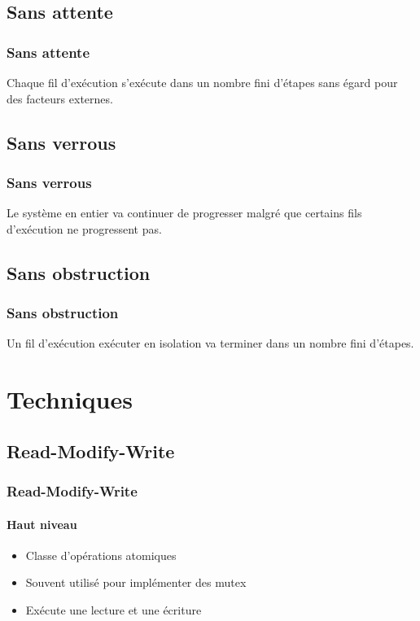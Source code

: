 \documentclass{beamer}
\begin{document}

\subsection{Sans attente}
\begin{frame}[fragile]
\frametitle{Sans attente}
Chaque fil d'exécution s'exécute dans un nombre fini d'étapes sans égard pour des facteurs externes.

\end{frame}


\subsection{Sans verrous}
\begin{frame}[fragile]
\frametitle{Sans verrous}
Le système en entier va continuer de progresser malgré que certains fils d'exécution ne progressent pas.

\end{frame}


\subsection{Sans obstruction}
\begin{frame}[fragile]
\frametitle{Sans obstruction}
Un fil d'exécution exécuter en isolation va terminer dans un nombre fini d'étapes.

\end{frame}

\section{Techniques}
\subsection{Read-Modify-Write}
\begin{frame}
\frametitle{Read-Modify-Write}
\framesubtitle{Haut niveau}
\begin{itemize}
\item Classe d'opérations atomiques
\item Souvent utilisé pour implémenter des mutex
\item Exécute une lecture et une écriture
\end{itemize}
\end{frame}
\end{document}
